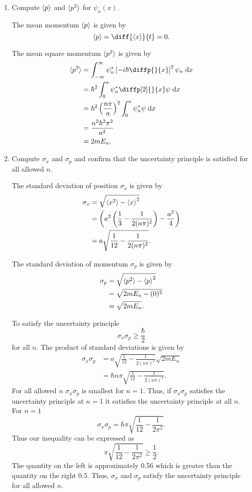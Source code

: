 \documentclass[a4paper, 12pt]{config/homework}
\begin{document}
\begin{enumerate}
\begin{enumerate}[label=(\alph*)]
\pagebreak
\item Compute \(\braket{p}\) and \(\braket{p^2}\) for \(\psi_n(x)\).

The mean momentum \(\braket{p}\) is given by
\[\braket{p} = \diff{\braket{x}}{t} = 0.\]

The mean square momentum \(\braket{p^2}\) is given by
\begin{align*}
\braket{p^2} &= \bint{-\infty}{\infty}{\psi_n^*\left[-i\hbar \diffp{}{x}\right]^2 \psi_n}{x}
\\&= \hbar^2 \bint{0}{a}{\psi_n^* \diffp[2]{}{x}\psi}{x}
\\&= \hbar^2 \left(\frac{n\pi}{a}\right)^2 \bint{0}{a}{\psi_n^* \psi}{x}
\\&= \frac{n^2 \hbar^2 \pi^2}{a^2}
\\&= 2m E_n.
\end{align*}

\pagebreak
\item Compute \(\sigma_x\) and \(\sigma_p\) and confirm that the uncertainty principle is satisfied for all allowed \(n\).

The standard deviation of position \(\sigma_x\) is given by
\begin{align*}
\sigma_x &= \sqrt{\braket{x^2} - \braket{x}^2}
\\&= \left( a^2\left(\frac{1}{3} - \frac{1}{2(n\pi)^2}\right) - \frac{a^2}{4}\right)
\\&= a \sqrt{\frac{1}{12} - \frac{1}{2(n\pi)^2}}.
\end{align*}

The standard deviation of momentum \(\sigma_p\) is given by
\begin{align*}
\sigma_p &= \sqrt{\braket{p^2} - \braket{p}^2}
\\&= \sqrt{2mE_n - (0)^2}
\\&= \sqrt{2m E_n}.
\end{align*}

To satisfy the uncertainty principle
\[\sigma_x \sigma_p \ge \frac{\hbar}{2}\]
for all \(n\). The product of standard deviations is given by
\begin{align*}
\sigma_x \sigma_p &= a \sqrt{\frac{1}{12} - \frac{1}{2(n\pi)^2}}\sqrt{2m E_n}
\\&= \hbar n \pi \sqrt{\frac{1}{12} - \frac{1}{2(n\pi)^2}}.
\end{align*}
For all allowed \(n\) \(\sigma_x\sigma_p\) is smallest for \(n=1\). Thus, if \(\sigma_x\sigma_p\) satisfies the uncertainty principle at \(n=1\) it satisfies the uncertainty principle at all \(n\). For \(n=1\)
\[\sigma_x \sigma_p = \hbar \pi \sqrt{\frac{1}{12} - \frac{1}{2\pi^2}}.\]
Thus our inequality can be expressed as
\[\pi \sqrt{\frac{1}{12} - \frac{1}{2\pi^2}} \ge \frac{1}{2}.\]
The quantity on the left is approximately 0.56 which is greater than the quantity on the right 0.5. Thus, \(\sigma_x\) and \(\sigma_p\) satisfy the uncertainty principle for all allowed \(n\).


\end{enumerate}
\end{enumerate}
\end{document}
